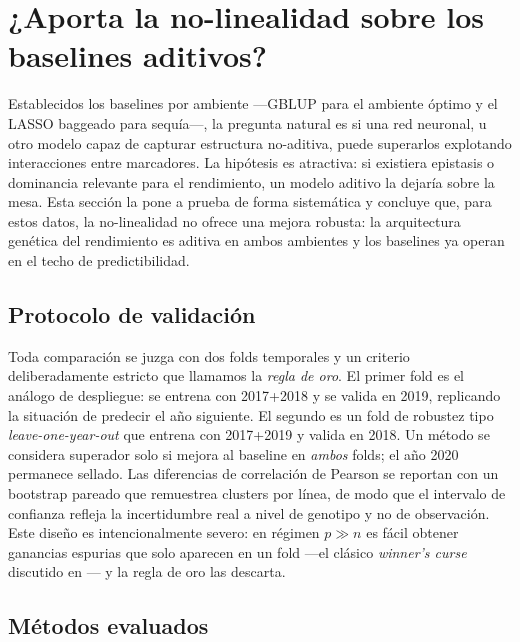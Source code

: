 
\section{¿Aporta la no-linealidad sobre los baselines aditivos?}
\label{sec:no-linealidad}

Establecidos los baselines por ambiente —GBLUP para el ambiente óptimo y el LASSO
baggeado para sequía—, la pregunta natural es si una red neuronal, u otro modelo capaz
de capturar estructura no-aditiva, puede superarlos explotando interacciones entre
marcadores. La hipótesis es atractiva: si existiera epistasis o dominancia relevante para
el rendimiento, un modelo aditivo la dejaría sobre la mesa. Esta sección la pone a prueba
de forma sistemática y concluye que, para estos datos, la no-linealidad no ofrece una
mejora robusta: la arquitectura genética del rendimiento es aditiva en ambos ambientes y
los baselines ya operan en el techo de predictibilidad.

\subsection{Protocolo de validación}

Toda comparación se juzga con dos folds temporales y un criterio deliberadamente estricto
que llamamos la \emph{regla de oro}. El primer fold es el análogo de despliegue: se
entrena con 2017+2018 y se valida en 2019, replicando la situación de predecir el año
siguiente. El segundo es un fold de robustez tipo \emph{leave-one-year-out} que entrena
con 2017+2019 y valida en 2018. Un método se considera superador solo si mejora al
baseline en \emph{ambos} folds; el año 2020 permanece sellado. Las diferencias de
correlación de Pearson se reportan con un bootstrap pareado que remuestrea clusters por
línea, de modo que el intervalo de confianza refleja la incertidumbre real a nivel de
genotipo y no de observación. Este diseño es intencionalmente severo: en régimen
$p \gg n$ es fácil obtener ganancias espurias que solo aparecen en un fold —el clásico
\emph{winner's curse} discutido en \citep{murphy2022}— y la regla de oro las descarta.

\subsection{Métodos evaluados}


